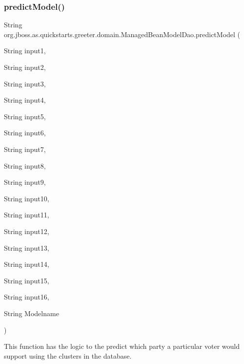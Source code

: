 \mbox{\label{classorg_1_1jboss_1_1as_1_1quickstarts_1_1greeter_1_1domain_1_1_managed_bean_model_dao_a4341e2de86398808ce85aed287d16cf5}} 
\subsubsection{\texorpdfstring{predict\+Model()}{predictModel()}}
{\footnotesize\ttfamily String org.\+jboss.\+as.\+quickstarts.\+greeter.\+domain.\+Managed\+Bean\+Model\+Dao.\+predict\+Model (\begin{DoxyParamCaption}\item[{String}]{input1,  }\item[{String}]{input2,  }\item[{String}]{input3,  }\item[{String}]{input4,  }\item[{String}]{input5,  }\item[{String}]{input6,  }\item[{String}]{input7,  }\item[{String}]{input8,  }\item[{String}]{input9,  }\item[{String}]{input10,  }\item[{String}]{input11,  }\item[{String}]{input12,  }\item[{String}]{input13,  }\item[{String}]{input14,  }\item[{String}]{input15,  }\item[{String}]{input16,  }\item[{String}]{Modelname }\end{DoxyParamCaption})}



This function has the logic to the predict which party a particular voter would support using the clusters in the database. 



